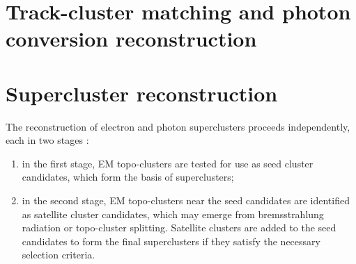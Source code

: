 \documentclass[a4paper, oneside]{book}
\begin{document}
		\section{Track-cluster matching and photon conversion reconstruction}
		
		\section{Supercluster reconstruction}
		The reconstruction of electron and photon superclusters proceeds independently, each in two stages \cite{El ph reco}:
		\begin{enumerate}
		\item in the first stage, EM topo-clusters are tested for use as seed cluster candidates, which form the
		basis of superclusters; 
		\item in the second stage, EM topo-clusters near the seed candidates are identified as satellite cluster candidates, which may emerge from bremsstrahlung radiation or topo-cluster splitting. Satellite clusters are added to the seed candidates to form the final superclusters if they
		satisfy the necessary selection criteria.
		\end{enumerate}
\end{document}
